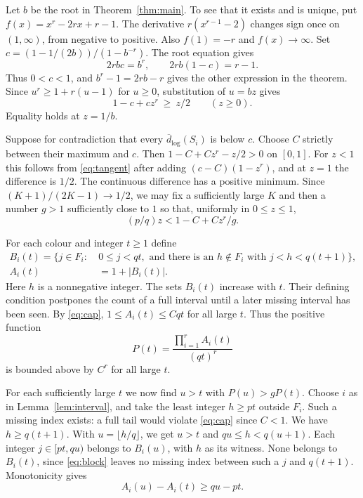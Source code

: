 \documentclass[11pt]{article}
\newcommand{\dd}{\overline d_{\log}}
\newcommand{\card}[1]{\lvert#1\rvert}
\begin{document}
Let $b$ be the root in Theorem~\ref{thm:main}. To see that it exists
and is unique, put $f(x)=x^r-2rx+r-1$. The derivative
$r(x^{r-1}-2)$ changes sign once on $(1,\infty)$, from negative to
positive. Also $f(1)=-r$ and $f(x)\to\infty$.
Set $c=(1-1/(2b))/(1-b^{-r})$. The root equation gives
\[
 2rb c=b^r,\qquad 2rb(1-c)=r-1.
\]
Thus $0<c<1$, and $b^r-1=2rb-r$ gives the other expression in the
theorem. Since $u^r\ge1+r(u-1)$ for $u\ge0$, substitution of $u=bz$
gives
\begin{equation}\label{eq:tangent}
 1-c+cz^r\ \ge\ z/2\qquad(z\ge0).
\end{equation}
Equality holds at $z=1/b$.

Suppose for contradiction that every $\dd(S_i)$ is below $c$. Choose
$C$ strictly between their maximum and $c$. Then
$1-C+Cz^r-z/2>0$ on $[0,1]$. For $z<1$ this follows from
\eqref{eq:tangent} after adding $(c-C)(1-z^r)$, and at $z=1$ the
difference is $1/2$. The continuous difference has a positive minimum.
Since $(K+1)/(2K-1)\to1/2$, we may fix a sufficiently large $K$ and
then a number $g>1$ sufficiently close to $1$ so that, uniformly in
$0\le z\le1$,
\begin{equation}\label{eq:strict}
 (p/q)z < 1-C+Cz^r/g.
\end{equation}

For each colour and integer $t\ge1$ define
\begin{align*}
 B_i(t)=\{j\in F_i:\ &0\le j<qt,\text{ and there is an }h\notin F_i
                         \text{ with }j<h<q(t+1)\},\\
 A_i(t)&=1+\card{B_i(t)}.
\end{align*}
Here $h$ is a nonnegative integer. The sets $B_i(t)$ increase with $t$.
Their defining condition postpones the count of a full interval until a
later missing interval has been seen. By \eqref{eq:cap},
$1\le A_i(t)\le Cqt$ for all large $t$. Thus the positive function
\[
 P(t)=\frac{\prod_{i=1}^r A_i(t)}{(qt)^r}
\]
is bounded above by $C^r$ for all large $t$.

For each sufficiently large $t$ we now find $u>t$ with
$P(u)>gP(t)$. Choose $i$ as in Lemma~\ref{lem:interval}, and take the
least integer $h\ge pt$ outside $F_i$.
Such a missing index exists: a full tail would violate
\eqref{eq:cap} since $C<1$. We have $h\ge q(t+1)$. With
$u=\lfloor h/q\rfloor$, we get $u>t$ and $qu\le h<q(u+1)$.
Each integer $j\in[pt,qu)$ belongs to $B_i(u)$, with $h$ as its
witness. None belongs to $B_i(t)$, since \eqref{eq:block} leaves no
missing index between such a $j$ and $q(t+1)$. Monotonicity gives
\begin{equation}\label{eq:inc}
 A_i(u)-A_i(t)\ge qu-pt.
\end{equation}
\end{document}
